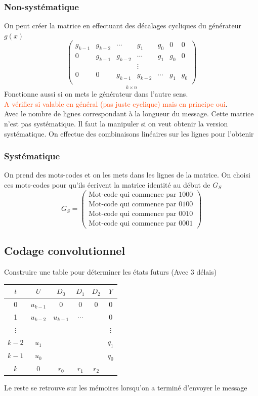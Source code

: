 \documentclass[resume.tex]{subfiles}
\begin{document}
\subsubsection{Non-systématique}
On peut créer la matrice en effectuant des décalages cycliques du générateur $g(x)$
$$\underset{k\times n}{\begin{pmatrix}
g_{k-1} & g_{k-2} & \cdots & g_{1} & g_0 & 0 & 0\\
0 & g_{k-1} & g_{k-2} & \cdots & g_{1} & g_0 & 0\\
 & & & \vdots\\
0 & 0 & g_{k-1} & g_{k-2} & \cdots & g_1 & g_0\\
\end{pmatrix}}$$
Fonctionne aussi si on mets le générateur dans l'autre sens.\\
\textcolor{OrangeRed}{A vérifier si valable en général (pas juste cyclique) mais en principe oui}.\\
Avec le nombre de lignes correspondant à la longueur du message. Cette matrice n'est pas systématique. Il faut la manipuler si on veut obtenir la version systématique. On effectue des combinaisons linéaires sur les lignes pour l'obtenir
\subsubsection{Systématique}
On prend des mots-codes et on les mets dans les lignes de la matrice. On choisi ces mots-codes pour qu'ils écrivent la matrice identité au début de $G_S$
$$G_S=\begin{pmatrix}
\text{Mot-code qui commence par } 1000\\
\text{Mot-code qui commence par } 0100\\
\text{Mot-code qui commence par } 0010\\
\text{Mot-code qui commence par } 0001
\end{pmatrix}$$
\subsection{Codage convolutionnel}
Construire une table pour déterminer les états futurs (Avec 3 délais)
\begin{center}
\begin{tabular}{cccccc}
$t$ & $U$ & $D_0$ & $D_1$ & $D_2$ & $Y$\\\hline
0 & $u_{k-1}$ & 0 & 0 & 0 & 0\\
1 & $u_{k-2}$ & $u_{k-1}$ & $\cdots$ & & $0$\\
$\vdots$ & & & & &  $\vdots$\\
$k-2$ & $u_1$ & & & & $q_1$\\
$k-1$ & $u_0$ & & & & $q_0$\\\hline
$k$ & $0$ & $r_0$ & $r_1$ & $r_2$
\end{tabular}
\end{center}
Le reste se retrouve sur les mémoires lorsqu'on a terminé d'envoyer le message
\end{document}
